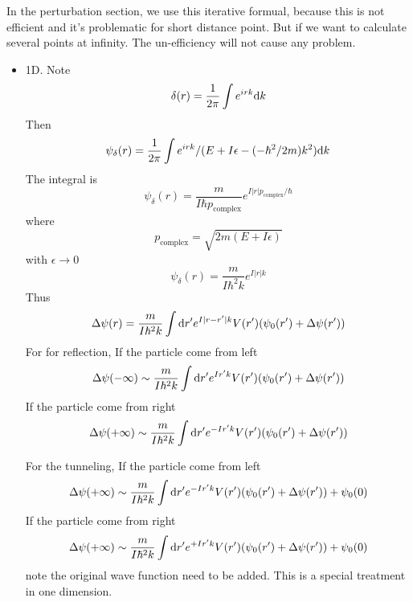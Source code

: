 \documentclass[12pt,twoside]{article}
\def\df{{\rm d}}
\begin{document}
In the perturbation section, we use this iterative formual, because this is not efficient and it's problematic for short distance point. But if we want to calculate several points at infinity. The un-efficiency will not cause any problem.
\begin{itemize}
  \item 1D. Note
  $$
  \delta(r) = \frac{1}{2\pi}\int e^{i r k} \df k
  $$
  Then
  $$
  \psi_\delta(r) = \frac{1}{2\pi}\int e^{i r k}/(E + I\epsilon -(-\hbar^2/2m)k^2) \df k
  $$
  The integral is
  $$
  \psi_\delta(r) = \frac{m}{I \hbar p_\text{complex}} e^{I|r|p_\text{complex}/\hbar}
  $$
  where
  $$
  p_\text{complex} = \sqrt{2m(E+I \epsilon)}
  $$
  with $\epsilon \rightarrow 0$
  $$
  \psi_\delta(r) = \frac{m}{I \hbar^2 k} e^{I|r|k}
  $$
  Thus
  $$
\Delta\psi(r) = \frac{m}{I \hbar^2 k}\int \df r^\prime  e^{I|r-r^\prime|k} V(r^\prime)(\psi_0(r^\prime) + \Delta\psi(r^\prime))
  $$
  For for reflection,   If the particle come from left
  $$
\Delta\psi(-\infty) \sim \frac{m}{I \hbar^2 k} \int \df r^\prime e^{Ir^\prime k} V(r^\prime)(\psi_0(r^\prime) + \Delta\psi(r^\prime))
  $$
  If the particle come from right
  $$
\Delta\psi(+\infty) \sim \frac{m}{I \hbar^2 k}\int \df r^\prime  e^{-I r^\prime k} V(r^\prime)(\psi_0(r^\prime) + \Delta\psi(r^\prime))
  $$

 For the tunneling,  If the particle come from left
  $$
\Delta\psi(+\infty) \sim \frac{m}{I \hbar^2 k} \int \df r^\prime e^{-Ir^\prime k} V(r^\prime)(\psi_0(r^\prime) + \Delta\psi(r^\prime)) + \psi_0(0)
  $$
    If the particle come from right
   $$
\Delta\psi(+\infty) \sim \frac{m}{I \hbar^2 k} \int \df r^\prime e^{+Ir^\prime k} V(r^\prime)(\psi_0(r^\prime) + \Delta\psi(r^\prime)) + \psi_0(0)
  $$
 note the original wave function need to be added. This is a special treatment in one dimension.


\end{itemize}
\end{document}
